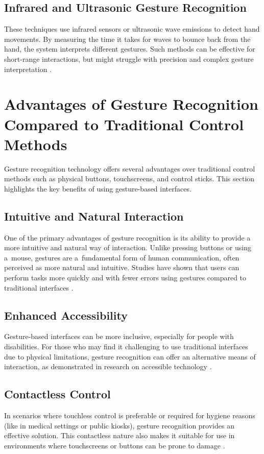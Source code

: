 \subsection{Infrared and Ultrasonic Gesture Recognition} These techniques use infrared sensors or ultrasonic wave emissions to detect hand movements. By measuring the time it takes for waves to bounce back from the hand, the system interprets different gestures. Such methods can be effective for short-range interactions, but might struggle with precision and complex gesture interpretation \cite{rahulnath2019gesture}.

\section{Advantages of Gesture Recognition Compared to Traditional Control Methods}

Gesture recognition technology offers several advantages over traditional control methods such as physical buttons, touchscreens, and control sticks. This section highlights the key benefits of using gesture-based interfaces.

\subsection{Intuitive and Natural Interaction}
One of the primary advantages of gesture recognition is its ability to provide a more intuitive and natural way of interaction. Unlike pressing buttons or using a~mouse, gestures are a~fundamental form of human communication, often perceived as more natural and intuitive. Studies have shown that users can perform tasks more quickly and with fewer errors using gestures compared to traditional interfaces \cite{Choi2014}.

\subsection{Enhanced Accessibility}
Gesture-based interfaces can be more inclusive, especially for people with disabilities. For those who may find it challenging to use traditional interfaces due to physical limitations, gesture recognition can offer an alternative means of interaction, as demonstrated in research on accessible technology \cite{Choi2014}.

\subsection{Contactless Control}
In scenarios where touchless control is preferable or required for hygiene reasons (like in medical settings or public kiosks), gesture recognition provides an effective solution. This contactless nature also makes it suitable for use in environments where touchscreens or buttons can be prone to damage \cite{Ye2018}.

